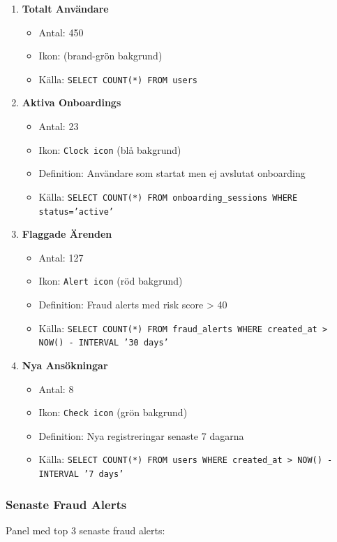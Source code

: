 \documentclass[12pt,a4paper]{article}
\begin{document}
\begin{enumerate}
  \item \textbf{Totalt Användare}
  \begin{itemize}
    \item Antal: 450
    \item Ikon:  (brand-grön bakgrund)
    \item Källa: \texttt{SELECT COUNT(*) FROM users}
  \end{itemize}
  
  \item \textbf{Aktiva Onboardings}
  \begin{itemize}
    \item Antal: 23
    \item Ikon: \texttt{Clock icon} (blå bakgrund)
    \item Definition: Användare som startat men ej avslutat onboarding
    \item Källa: \texttt{SELECT COUNT(*) FROM onboarding\_sessions WHERE status='active'}
  \end{itemize}
  
  \item \textbf{Flaggade Ärenden}
  \begin{itemize}
    \item Antal: 127
    \item Ikon: \texttt{Alert icon} (röd bakgrund)
    \item Definition: Fraud alerts med risk score > 40
    \item Källa: \texttt{SELECT COUNT(*) FROM fraud\_alerts WHERE created\_at > NOW() - INTERVAL '30 days'}
  \end{itemize}
  
  \item \textbf{Nya Ansökningar}
  \begin{itemize}
    \item Antal: 8
    \item Ikon: \texttt{Check icon} (grön bakgrund)
    \item Definition: Nya registreringar senaste 7 dagarna
    \item Källa: \texttt{SELECT COUNT(*) FROM users WHERE created\_at > NOW() - INTERVAL '7 days'}
  \end{itemize}
\end{enumerate}

\subsubsection{Senaste Fraud Alerts}
Panel med top 3 senaste fraud alerts:
\end{document}
